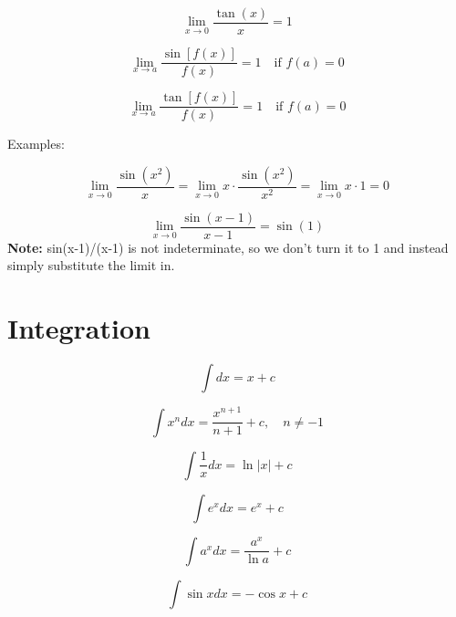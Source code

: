 \documentclass{article}
\begin{document}
\begin{equation}
\lim_{x \to 0} \frac{\tan(x)}{x} = 1
\end{equation}

\begin{equation}
\lim_{x \to a} \frac{\sin[f(x)]}{f(x)} = 1 \quad \text{if } f(a) = 0
\end{equation}

\begin{equation}
\lim_{x \to a} \frac{\tan[f(x)]}{f(x)} = 1 \quad \text{if } f(a) = 0
\end{equation}

Examples:

\begin{equation}
\lim_{x \to 0} \frac{\sin(x^2)}{x} = \lim_{x \to 0} x \cdot \frac{\sin(x^2)}{x^2} = \lim_{x \to 0} x \cdot 1 = 0
\end{equation}

\begin{equation}
\lim_{x \to 0} \frac{\sin(x-1)}{x-1} = \sin(1)
\end{equation}
\textbf{Note:} sin(x-1)/(x-1) is not indeterminate, so we don't turn it to 1 and instead simply substitute the limit in.

\section{Integration}

\begin{equation}
\int dx = x + c
\end{equation}

\begin{equation}
\int x^n dx = \frac{x^{n+1}}{n+1} + c, \quad n \neq -1
\end{equation}

\begin{equation}
\int \frac{1}{x} dx = \ln|x| + c
\end{equation}

\begin{equation}
\int e^x dx = e^x + c
\end{equation}

\begin{equation}
\int a^x dx = \frac{a^x}{\ln a} + c
\end{equation}

\begin{equation}
\int \sin x dx = -\cos x + c
\end{equation}
\end{document}
